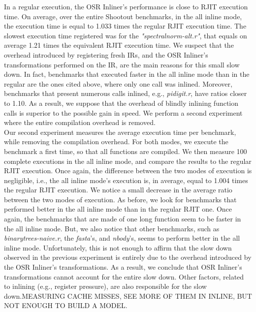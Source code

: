 In a regular execution, the OSR Inliner's performance is close to RJIT execution time.
On average, over the entire Shootout benchmarks, in the all inline mode, the execution time is equal to 1.033 times the regular RJIT execution time.
The slowest execution time registered was for the \textit{"spectralnorm-alt.r"}, that equals on average 1.21 times the equivalent RJIT execution time.
We suspect that the overhead introduced by registering fresh IRs, and the OSR Inliner's transformations performed on the IR, are the main reasons for this small slow down.
In fact, benchmarks that executed faster in the all inline mode than in the regular are the ones cited above, where only one call was inlined.
Moreover, benchmarks that present numerous calls inlined, e.g., \textit{pidigit.r}, have ratios closer to 1.10.
As a result, we suppose that the overhead of blindly inlining function calls is superior to the possible gain in speed. 
We perform a second experiment where the entire compilation overhead is removed.\\

Our second experiment measures the average execution time per benchmark, while removing the compilation overhead.
For both modes, we execute the benchmark a first time, so that all functions are compiled. 
We then measure 100 complete executions in the all inline mode, and compare the results to the regular RJIT execution.
Once again, the difference between the two modes of execution is negligible, i.e., the all inline mode's execution is, in average, equal to 1.004 times the regular RJIT execution.
We notice a small decrease in the average ratio between the two modes of execution.
As before, we look for benchmarks that performed better in the all inline mode than in the regular RJIT one.
Once again, the benchmarks that are made of one long function seem to be faster in the all inline mode.
But, we also notice that other benchmarks, such as \textit{binarytrees-naive.r}, the \textit{fasta}'s, and \textit{nbody}'s, seems to perform better in the all inline mode.
Unfortunately, this is not enough to affirm that the slow down observed in the previous experiment is entirely due to the overhead introduced by the OSR Inliner's transformations.
As a result, we conclude that OSR Inliner's transformations cannot account for the entire slow down.
Other factors, related to inlining (e.g., register pressure), are also responsible for the slow down.MEASURING CACHE MISSES, SEE MORE OF THEM IN INLINE, BUT NOT ENOUGH TO BUILD A MODEL.
\\

